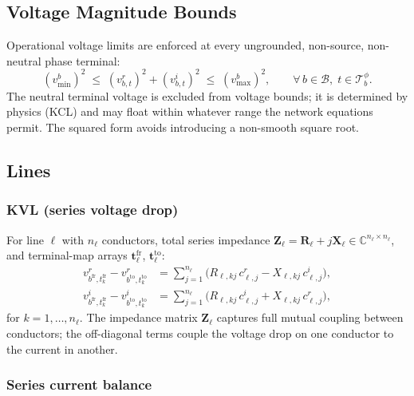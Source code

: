 \documentclass[11pt,a4paper]{article}
\newcommand{\C}{\mathbb{C}}
\newcommand{\mc}[1]{\mathcal{#1}}
\newcommand{\vr}[2]{v^r_{#1,#2}}
\newcommand{\vi}[2]{v^i_{#1,#2}}
\newcommand{\Zmat}{\mathbf{Z}}
\newcommand{\Rmat}{\mathbf{R}}
\newcommand{\Xmat}{\mathbf{X}}
\begin{document}
\subsection{Voltage Magnitude Bounds}

Operational voltage limits are enforced at every ungrounded, non-source,
non-neutral phase terminal:
%
\begin{equation}
  \left(v^b_\text{min}\right)^2
  \;\leq\;
  \left(\vr{b}{t}\right)^2 + \left(\vi{b}{t}\right)^2
  \;\leq\;
  \left(v^b_\text{max}\right)^2,
  \qquad \forall\,b\in\mc{B},\; t\in\mc{T}_b^\phi.
\end{equation}
%
The neutral terminal voltage is excluded from voltage bounds; it is determined
by physics (KCL) and may float within whatever range the network equations
permit.  The squared form avoids introducing a non-smooth square root.

\subsection{Lines}
\label{sec:lines}

\subsubsection*{KVL (series voltage drop)}

For line $\ell$ with $n_\ell$ conductors, total series impedance
$\Zmat_\ell = \Rmat_\ell + j\Xmat_\ell \in \C^{n_\ell\times n_\ell}$, and
terminal-map arrays $\mathbf{t}^\text{fr}_\ell$, $\mathbf{t}^\text{to}_\ell$:
%
\begin{align}
  \vr{b^\text{fr}}{t^\text{fr}_k}
  - \vr{b^\text{to}}{t^\text{to}_k}
  &= \sum_{j=1}^{n_\ell}
     \bigl(R_{\ell,kj}\,c^r_{\ell,j} - X_{\ell,kj}\,c^i_{\ell,j}\bigr),
  \label{eq:kvl-r} \\[4pt]
  \vi{b^\text{fr}}{t^\text{fr}_k}
  - \vi{b^\text{to}}{t^\text{to}_k}
  &= \sum_{j=1}^{n_\ell}
     \bigl(R_{\ell,kj}\,c^i_{\ell,j} + X_{\ell,kj}\,c^r_{\ell,j}\bigr),
  \label{eq:kvl-i}
\end{align}
%
for $k = 1,\ldots,n_\ell$.  The impedance matrix $\Zmat_\ell$ captures full
mutual coupling between conductors; the off-diagonal terms couple the voltage
drop on one conductor to the current in another.

\subsubsection*{Series current balance}
\end{document}
